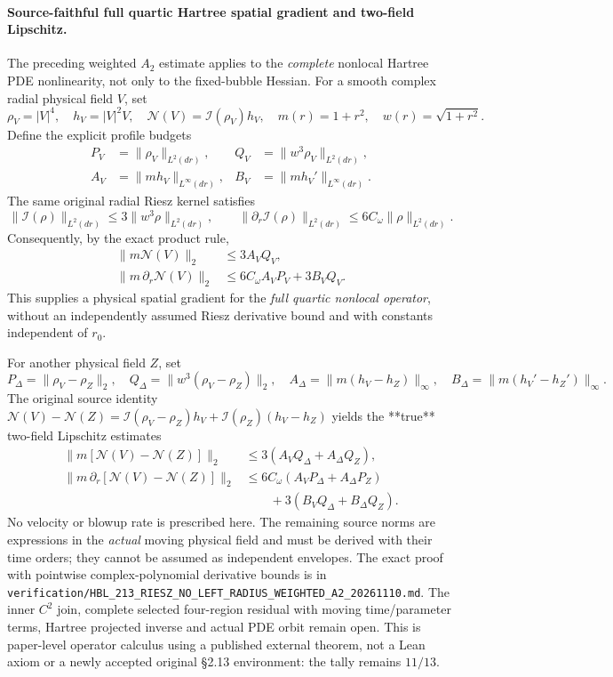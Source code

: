 \documentclass[11pt]{amsart}
\begin{document}
\paragraph{Source-faithful full quartic Hartree spatial gradient and two-field Lipschitz.}
The preceding weighted \(A_2\) estimate applies to the
\emph{complete} nonlocal Hartree PDE nonlinearity,
not only to the fixed-bubble Hessian. For a smooth
complex radial physical field \(V\), set
\[
 \rho_V=|V|^4,\quad h_V=|V|^2V,\quad
 \mathcal N(V)=\mathcal I(\rho_V)h_V,\quad
 m(r)=1+r^2,\quad w(r)=\sqrt{1+r^2}.
\]
Define the explicit profile budgets
\[
 \begin{aligned}
  P_V&=\|\rho_V\|_{L^2(dr)},&
  Q_V&=\|w^3\rho_V\|_{L^2(dr)},\\
  A_V&=\|m h_V\|_{L^\infty(dr)},&
  B_V&=\|m h_V'\|_{L^\infty(dr)}.
 \end{aligned}
\]
The same original radial Riesz kernel
satisfies
\[
 \|\mathcal I(\rho)\|_{L^2(dr)}
  \le3\|w^3\rho\|_{L^2(dr)},\qquad
 \|\partial_r\mathcal I(\rho)\|_{L^2(dr)}
  \le6C_\omega\|\rho\|_{L^2(dr)}.
\]
Consequently, by the exact product rule,
\[
 \boxed{\begin{aligned}
 \|m\mathcal N(V)\|_2&\le3A_VQ_V,\\
 \|m\,\partial_r\mathcal N(V)\|_2
   &\le6C_\omega A_VP_V+3B_VQ_V.
 \end{aligned}}
\]
This supplies a physical spatial gradient for
the \emph{full quartic nonlocal operator},
without an independently assumed Riesz derivative
bound and with constants independent of \(r_0\).

For another physical field \(Z\), set
\[
  P_\Delta=\|\rho_V-\rho_Z\|_2,\quad
  Q_\Delta=\|w^3(\rho_V-\rho_Z)\|_2,\quad
  A_\Delta=\|m(h_V-h_Z)\|_\infty,\quad
  B_\Delta=\|m(h_V'-h_Z')\|_\infty.
\]
The original source identity
\(\mathcal N(V)-\mathcal N(Z)
=\mathcal I(\rho_V-\rho_Z)h_V+
 \mathcal I(\rho_Z)(h_V-h_Z)\)
yields the **true** two-field Lipschitz estimates
\[
 \begin{aligned}
  \|m[\mathcal N(V)-\mathcal N(Z)]\|_2
    &\le3(A_VQ_\Delta+A_\Delta Q_Z),\\
  \|m\,\partial_r[\mathcal N(V)-\mathcal N(Z)]\|_2
    &\le6C_\omega(A_VP_\Delta+A_\Delta P_Z)\\
    &\qquad+3(B_VQ_\Delta+B_\Delta Q_Z).
 \end{aligned}
\]
No velocity or blowup rate is prescribed here.
The remaining source norms are expressions in
the \emph{actual} moving physical field and must
be derived with their time orders; they cannot be
assumed as independent envelopes. The exact
proof with pointwise complex-polynomial derivative
bounds is in
\texttt{verification/HBL\_213\_RIESZ\_NO\_LEFT\_RADIUS\_WEIGHTED\_A2\_20261110.md}.
The inner \(C^2\) join, complete selected four-region
residual with moving time/parameter terms, Hartree
projected inverse and actual PDE orbit remain open.
This is paper-level operator calculus using
a published external theorem, not a Lean axiom
or a newly accepted original §2.13 environment:
the tally remains \(11/13\).
\end{document}
